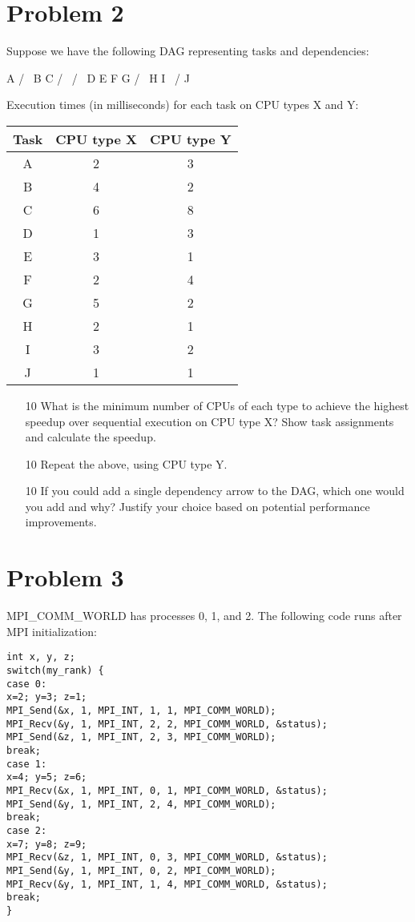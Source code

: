 \documentclass{article}
\begin{document}
\section*{Problem 2}
Suppose we have the following DAG representing tasks and dependencies:

      A
     / \
    B   C
   / \ / \
  D  E F  G
     / \
    H   I
     \ /
      J

Execution times (in milliseconds) for each task on CPU types X and Y:

\begin{tabular}{|c|c|c|}
\hline
Task & CPU type X & CPU type Y \\
\hline
A & 2 & 3 \\
B & 4 & 2 \\
C & 6 & 8 \\
D & 1 & 3 \\
E & 3 & 1 \\
F & 2 & 4 \\
G & 5 & 2 \\
H & 2 & 1 \\
I & 3 & 2 \\
J & 1 & 1 \\
\hline
\end{tabular}

\begin{enumerate}
    \item [10] What is the minimum number of CPUs of each type to achieve the highest speedup over sequential execution on CPU type X? Show task assignments and calculate the speedup.
    \item [10] Repeat the above, using CPU type Y.
    \item [10]  If you could add a single dependency arrow to the DAG, which one would you add and why?  Justify your choice based on potential performance improvements.
\end{enumerate}

\section*{Problem 3}
MPI\_COMM\_WORLD has processes 0, 1, and 2.  The following code runs after MPI initialization:

\begin{verbatim}
int x, y, z;
switch(my_rank) {
case 0:
x=2; y=3; z=1;
MPI_Send(&x, 1, MPI_INT, 1, 1, MPI_COMM_WORLD);
MPI_Recv(&y, 1, MPI_INT, 2, 2, MPI_COMM_WORLD, &status);
MPI_Send(&z, 1, MPI_INT, 2, 3, MPI_COMM_WORLD);
break;
case 1:
x=4; y=5; z=6;
MPI_Recv(&x, 1, MPI_INT, 0, 1, MPI_COMM_WORLD, &status);
MPI_Send(&y, 1, MPI_INT, 2, 4, MPI_COMM_WORLD);
break;
case 2:
x=7; y=8; z=9;
MPI_Recv(&z, 1, MPI_INT, 0, 3, MPI_COMM_WORLD, &status);
MPI_Send(&y, 1, MPI_INT, 0, 2, MPI_COMM_WORLD);
MPI_Recv(&y, 1, MPI_INT, 1, 4, MPI_COMM_WORLD, &status);
break;
}
\end{verbatim}
\end{document}
